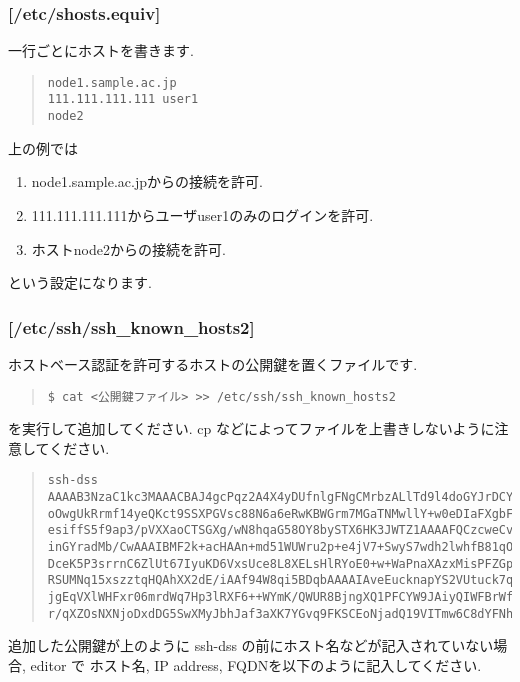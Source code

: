 \documentclass[a4paper,titlepage]{jreport}
\begin{document}
\subsubsection{[/etc/shosts.equiv]}

一行ごとにホストを書きます.

\begin{quote}
\begin{screen}
\begin{verbatim}
node1.sample.ac.jp
111.111.111.111 user1
node2
\end{verbatim}
\end{screen}
\end{quote}

上の例では

\begin{enumerate}
\item node1.sample.ac.jpからの接続を許可.
\item 111.111.111.111からユーザuser1のみのログインを許可.
\item ホストnode2からの接続を許可.
\end{enumerate}

という設定になります.

\subsubsection{[/etc/ssh/ssh\_known\_hosts2]}

ホストベース認証を許可するホストの公開鍵を置くファイルです.

\begin{quote}
\begin{screen}
\begin{verbatim}
$ cat <公開鍵ファイル> >> /etc/ssh/ssh_known_hosts2
\end{verbatim}
\end{screen}
\end{quote}

を実行して追加してください. cp などによってファイルを上書きしないように注意してください. 

\begin{quote}
\begin{screen}
\begin{verbatim}
ssh-dss AAAAB3NzaC1kc3MAAACBAJ4gcPqz2A4X4yDUfnlgFNgCMrbzALlTd9l4doGYJrDCYD
oOwgUkRrmf14yeQKct9SSXPGVsc88N6a6eRwKBWGrm7MGaTNMwllY+w0eDIaFXgbFXGqx1pnz4
esiffS5f9ap3/pVXXaoCTSGXg/wN8hqaG58OY8bySTX6HK3JWTZ1AAAAFQCzcweCvbIyLJqidT
inGYradMb/CwAAAIBMF2k+acHAAn+md51WUWru2p+e4jV7+SwyS7wdh2lwhfB81qOdGvP8BgY9
DceK5P3srrnC6ZlUt67IyuKD6VxsUce8L8XELsHlRYoE0+w+WaPnaXAzxMisPFZGpClGnzsutN
RSUMNq15xszztqHQAhXX2dE/iAAf94W8qi5BDqbAAAAIAveEucknapYS2VUtuck7qyT21DuVdZ
jgEqVXlWHFxr06mrdWq7Hp3lRXF6++WYmK/QWUR8BjngXQ1PFCYW9JAiyQIWFBrWfWtbElmR6g
r/qXZOsNXNjoDxdDG5SwXMyJbhJaf3aXK7YGvq9FKSCEoNjadQ19VITmw6C8dYFNh8yQ=
\end{verbatim}
\end{screen}
\end{quote}
追加した公開鍵が上のように ssh-dss の前にホスト名などが記入されていない場合, editor で
ホスト名, IP address, FQDNを以下のように記入してください.
\end{document}
